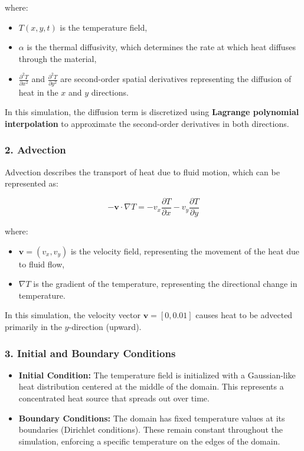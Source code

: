 where:
\begin{itemize}
    \item \( T(x, y, t) \) is the temperature field,
    \item \( \alpha \) is the thermal diffusivity, which determines the rate at which heat diffuses through the material,
    \item \( \frac{\partial^2 T}{\partial x^2} \) and \( \frac{\partial^2 T}{\partial y^2} \) are second-order spatial derivatives representing the diffusion of heat in the \( x \) and \( y \) directions.
\end{itemize}

In this simulation, the diffusion term is discretized using \textbf{Lagrange polynomial interpolation} to approximate the second-order derivatives in both directions.
\newpage
\subsubsection*{2. Advection}
Advection describes the transport of heat due to fluid motion, which can be represented as:

\[
-\mathbf{v} \cdot \nabla T = -v_x \frac{\partial T}{\partial x} - v_y \frac{\partial T}{\partial y}
\]

where:
\begin{itemize}
    \item \( \mathbf{v} = (v_x, v_y) \) is the velocity field, representing the movement of the heat due to fluid flow,
    \item \( \nabla T \) is the gradient of the temperature, representing the directional change in temperature.
\end{itemize}

In this simulation, the velocity vector \( \mathbf{v} = [0, 0.01] \) causes heat to be advected primarily in the \( y \)-direction (upward).

\subsubsection*{3. Initial and Boundary Conditions}
\begin{itemize}
    \item \textbf{Initial Condition:} The temperature field is initialized with a Gaussian-like heat distribution centered at the middle of the domain. This represents a concentrated heat source that spreads out over time.
    \item \textbf{Boundary Conditions:} The domain has fixed temperature values at its boundaries (Dirichlet conditions). These remain constant throughout the simulation, enforcing a specific temperature on the edges of the domain.
\end{itemize}

